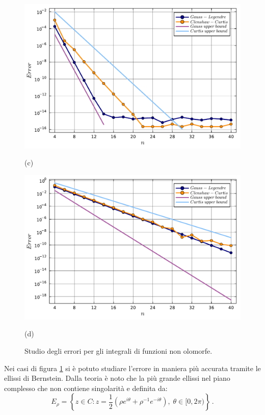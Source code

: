 \documentclass[letterpaper, 12pt]{article}
\begin{document}
\begin{figure}[!ht]
    \centering
    \begin{minipage}[b]{0.47\textwidth}
        \includegraphics[width=\textwidth]{5413.pdf}
        \caption*{(c)}
    \end{minipage}
    \hspace{0.5cm}
    \begin{minipage}[b]{0.47\textwidth}
        \includegraphics[width=\textwidth]{5414.pdf}
        \caption*{(d)}
    \end{minipage}
    \caption{Studio degli errori per gli integrali di funzioni non olomorfe.}
    \label{fig:es5_4_1_2}
\end{figure}

Nei casi di figura \ref{fig:es5_4_1_2} si è potuto studiare l'errore in maniera più accurata tramite le ellissi
di Bernstein. Dalla teoria è noto che la più grande ellissi nel piano complesso che non contiene singolarità e 
definita da: 
\begin{equation}
    E_\rho = \left\{ z \in C : z = \frac{1}{2} \left( \rho e^{i\theta} + \rho^{-1} e^{-i\theta} \right), \; \theta \in [0, 2\pi) \right\}\,.
\end{equation}
\end{document}
